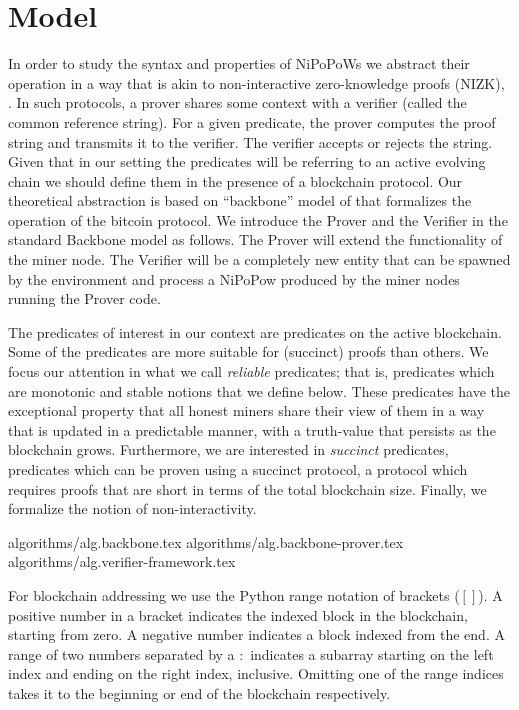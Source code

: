 \section{Model}

In order to study the syntax and properties of NiPoPoWs
we abstract their operation in a way that is akin to non-interactive
zero-knowledge proofs (NIZK), \cite{BFM88}. In such protocols, a prover
shares some context with a verifier (called the common reference string).
For a given predicate, the prover computes the proof string and transmits it
to the verifier. The verifier accepts or rejects the string. Given that in our
setting the predicates will be referring to an active evolving chain 
we should define them in the presence of a blockchain protocol. 
Our theoretical abstraction is based on ``backbone'' model of
\cite{backbone} that formalizes the operation of the bitcoin protocol.
We introduce the Prover and the Verifier in
the standard Backbone model as follows. The Prover will extend the functionality
of the miner node. The Verifier will be a completely new entity that can be spawned
by the environment and process a NiPoPow produced by the miner nodes running
the Prover code. 

The predicates of interest in our context are predicates on the active blockchain. 
Some of the predicates are more suitable for (succinct) proofs than others. We focus
our attention in what we call \textit{reliable} predicates; that is,
predicates which are monotonic and stable notions that we define below.  
These predicates have the
exceptional property that all honest miners share their view of them in a way
that is updated in a predictable manner, with a truth-value that persists as the
blockchain grows.  Furthermore, we are interested in \textit{succinct}
predicates, predicates which can be proven using a succinct protocol, a
protocol which requires proofs that are short in terms of the total blockchain
size. Finally, we formalize the notion of non-interactivity.


{algorithms/alg.backbone.tex}
{algorithms/alg.backbone-prover.tex}
{algorithms/alg.verifier-framework.tex}

For blockchain addressing we use the Python range notation of brackets ($[]$).
A positive number in a bracket indicates the indexed block in the blockchain,
starting from zero. A negative number indicates a block indexed from the end. A
range of two numbers separated by a $:$ indicates a subarray starting on the
left index and ending on the right index, inclusive. Omitting one of the range
indices takes it to the beginning or end of the blockchain respectively.

